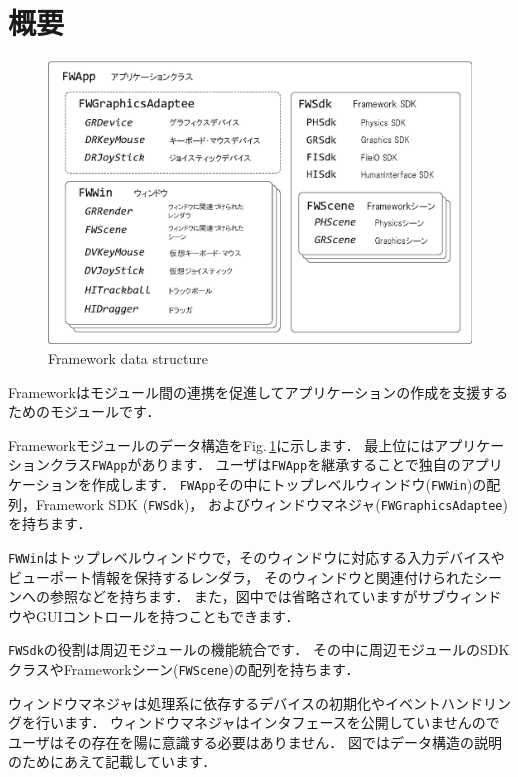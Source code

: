 \section{概要}


\begin{figure}[t]
\begin{center}
\includegraphics[width=.7\hsize]{fig/framework.eps}
\end{center}
\caption{Framework data structure}
\label{fig_framework}
\end{figure}


Frameworkはモジュール間の連携を促進してアプリケーションの作成を支援するためのモジュールです．

Frameworkモジュールのデータ構造をFig.\,\ref{fig_framework}に示します．
\KLUDGE 最上位にはアプリケーションクラス\texttt{FWApp}があります．
\KLUDGE ユーザは\texttt{FWApp}を継承することで独自のアプリケーションを作成します．
\texttt{FWApp}その中にトップレベルウィンドウ(\texttt{FWWin})の配列，Framework SDK (\texttt{FWSdk})，
\KLUDGE およびウィンドウマネジャ(\texttt{FWGraphicsAdaptee})を持ちます．

\texttt{FWWin}はトップレベルウィンドウで，そのウィンドウに対応する入力デバイスやビューポート情報を保持するレンダラ，
\KLUDGE そのウィンドウと関連付けられたシーンへの参照などを持ちます．
\KLUDGE また，図中では省略されていますがサブウィンドウやGUIコントロールを持つこともできます．

\texttt{FWSdk}の役割は周辺モジュールの機能統合です．
\KLUDGE その中に周辺モジュールのSDKクラスやFrameworkシーン(\texttt{FWScene})の配列を持ちます．

\KLUDGE ウィンドウマネジャは処理系に依存するデバイスの初期化やイベントハンドリングを行います．
\KLUDGE ウィンドウマネジャはインタフェースを公開していませんのでユーザはその存在を陽に意識する必要はありません．
\KLUDGE 図ではデータ構造の説明のためにあえて記載しています．

